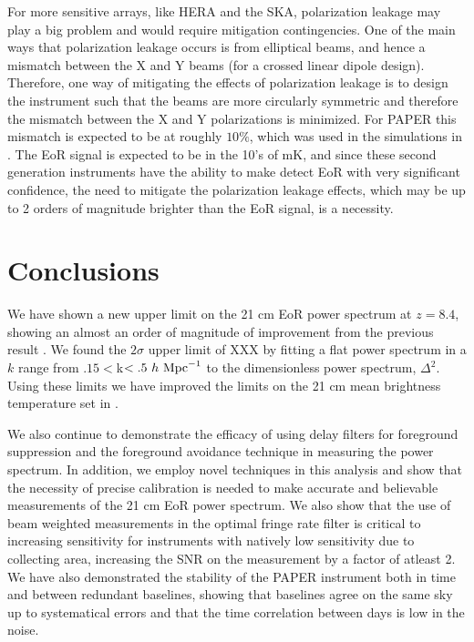 \documentclass[twocolumn,numberedappendix]{emulateapj} \shorttitle{PSA64}
\begin{document}
For more sensitive arrays, like HERA and the SKA, polarization leakage may play
a big problem and would require mitigation contingencies. One of the main ways
that polarization leakage occurs is from elliptical beams, and hence a mismatch
between the X and Y beams (for a crossed linear dipole design). Therefore, one
way of mitigating the effects of polarization leakage is to design the
instrument such that the beams are more circularly symmetric and therefore the
mismatch between the X and Y polarizations is minimized. For PAPER this mismatch
is expected to be at roughly $10\%$, which was used in the simulations in
\cite{moore_et_al2013}.  The EoR signal is expected to be in the 10's of mK, and
since these second generation instruments have the ability to make detect EoR
with very significant confidence, the need to mitigate the polarization leakage
effects, which may be up to 2 orders of magnitude brighter than the EoR signal,
is a necessity.

\section{Conclusions}
We have shown a new upper limit on the 21 cm EoR power spectrum at $z=8.4$,
showing an almost an order of magnitude of improvement from the previous result
\cite{parsons_et_al2014}. We found the $2\sigma$ upper limit of XXX by fitting a
flat power spectrum in a $k$ range from $.15<$k$<.5\ h\ {\rm Mpc}^{-1}$ to the
dimensionless power spectrum, $\Delta^{2}$. Using these limits we have improved
the limits on the 21 cm mean brightness temperature set in
\cite{parsons_et_al2014}.

We also continue to demonstrate the efficacy of using delay filters for
foreground suppression and the foreground avoidance technique in measuring the power
spectrum. In addition, we employ novel techniques in this analysis and show that
the necessity of precise calibration is needed to make accurate and believable
measurements of the 21 cm EoR power spectrum. We also show that the use of beam
weighted measurements in the optimal fringe rate filter is critical to
increasing sensitivity for instruments with natively low sensitivity due to
collecting area, increasing the SNR on the measurement by a factor of atleast 2.
We have also demonstrated the stability of the PAPER instrument both in time and
between redundant baselines, showing that baselines agree on the same sky up to
systematical errors and that the time correlation between days is low in the
noise.
\end{document}
